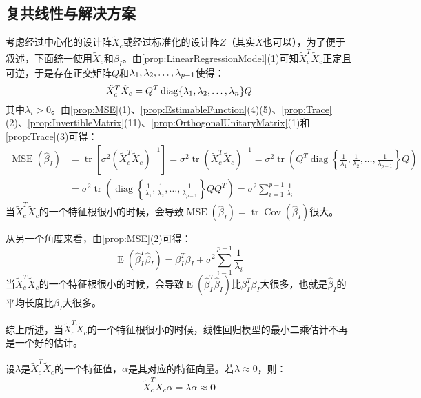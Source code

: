 \subsection{复共线性与解决方案}
\begin{note}
	考虑经过中心化的设计阵$\tilde{X}_c$或经过标准化的设计阵$Z$（其实$\tilde{X}$也可以），为了便于叙述，下面统一使用$\tilde{X}_c$和$\beta_I$。由\cref{prop:LinearRegressionModel}(1)可知$\tilde{X}_c^T\tilde{X}_c$正定且可逆，于是存在正交矩阵$Q$和$\lambda_1, \lambda_2, \dots, \lambda_{p-1}$使得：
	\begin{equation*}
		\tilde{X}_c^T\tilde{X}_c=Q^T\operatorname{diag}\{\lambda_1, \lambda_2, \dots, \lambda_{n}\}Q
	\end{equation*}
	其中$\lambda_i>0$。由\cref{prop:MSE}(1)、\cref{prop:EstimableFunction}(4)(5)、\cref{prop:Trace}(2)、\cref{prop:InvertibleMatrix}(11)、\cref{prop:OrthogonalUnitaryMatrix}(1)和\cref{prop:Trace}(3)可得：
	\begin{align*}
		\operatorname{MSE}(\hat{\beta}_I)&=\operatorname{tr}[\sigma^2(\tilde{X}_c^T\tilde{X}_c)^{-1}]=\sigma^2\operatorname{tr}(\tilde{X}_c^T\tilde{X}_c)^{-1}=\sigma^2\operatorname{tr}
		\left(Q^T\operatorname{diag}\left\{\frac{1}{\lambda_1},\frac{1}{\lambda_2},\dots,\frac{1}{\lambda_{p-1}}\right\}Q\right) \\
		&=\sigma^2\operatorname{tr}
		\left(\operatorname{diag}\left\{\frac{1}{\lambda_1},\frac{1}{\lambda_2},\dots,\frac{1}{\lambda_{p-1}}\right\}QQ^T\right)=\sigma^2\sum_{i=1}^{p-1}\frac{1}{\lambda_i}
	\end{align*}
	当$\tilde{X}_c^T\tilde{X}_c$的一个特征根很小的时候，会导致$\operatorname{MSE}(\hat{\beta}_I)=\operatorname{tr}\operatorname{Cov}(\hat{\beta}_I)$很大。\par
	从另一个角度来看，由\cref{prop:MSE}(2)可得：
	\begin{equation*}
		\operatorname{E}(\hat{\beta}_I^T\hat{\beta}_I)=\beta_I^T\beta_I+\sigma^2\sum_{i=1}^{p-1}\frac{1}{\lambda_i}
	\end{equation*}
	当$\tilde{X}_c^T\tilde{X}_c$的一个特征根很小的时候，会导致$\operatorname{E}(\hat{\beta}_I^T\hat{\beta}_I)$比$\beta_I^T\beta_I$大很多，也就是$\hat{\beta}_I$的平均长度比$\beta_I$大很多。\par
	综上所述，当$\tilde{X}_c^T\tilde{X}_c$的一个特征根很小的时候，线性回归模型的最小二乘估计不再是一个好的估计。\par
	设$\lambda$是$\tilde{X}_c^T\tilde{X}_c$的一个特征值，$\alpha$是其对应的特征向量。若$\lambda\approx0$，则：
	\begin{gather*}
		\tilde{X}_c^T\tilde{X}_c\alpha=\lambda\alpha\approx\mathbf{0} \\

\end{gather*}
\end{note}
